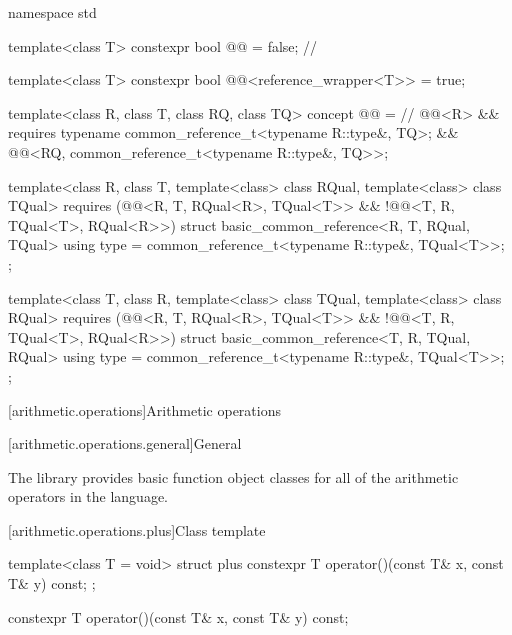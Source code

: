 %
\begin{codeblock}
namespace std {
  template<class T>
    constexpr bool @@ = false;                              // \expos

  template<class T>
    constexpr bool @@<reference_wrapper<T>> = true;

  template<class R, class T, class RQ, class TQ>
    concept @@ =                     // \expos
      @@<R> &&
      requires { typename common_reference_t<typename R::type&, TQ>; } &&
      @@<RQ, common_reference_t<typename R::type&, TQ>>;

  template<class R, class T, template<class> class RQual, template<class> class TQual>
    requires (@@<R, T, RQual<R>, TQual<T>> &&
              !@@<T, R, TQual<T>, RQual<R>>)
  struct basic_common_reference<R, T, RQual, TQual> {
    using type = common_reference_t<typename R::type&, TQual<T>>;
  };

  template<class T, class R, template<class> class TQual, template<class> class RQual>
    requires (@@<R, T, RQual<R>, TQual<T>> &&
              !@@<T, R, TQual<T>, RQual<R>>)
  struct basic_common_reference<T, R, TQual, RQual> {
    using type = common_reference_t<typename R::type&, TQual<T>>;
  };
}
\end{codeblock}

[arithmetic.operations]{Arithmetic operations}

[arithmetic.operations.general]{General}

\pnum
The library provides basic function object classes for all of the arithmetic
operators in the language.

[arithmetic.operations.plus]{Class template }

%
\begin{itemdecl}
template<class T = void> struct plus {
  constexpr T operator()(const T& x, const T& y) const;
};
\end{itemdecl}

%
\begin{itemdecl}
constexpr T operator()(const T& x, const T& y) const;
\end{itemdecl}


